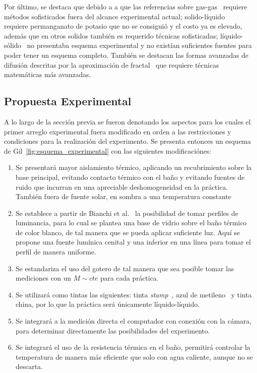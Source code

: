 \documentclass[11pt]{article}
\begin{document}
Por último, se destaca que debido a a que las referencias sobre gas-gas~\cite{hanTemperatureDependenceOxygen1996} requiere métodos sofisticados fuera del alcance experimental actual; solido-líquido~\cite{micaelaDifusionKMnO4Agua2006} requiere permanganato de potasio que no se consiguió y el costo ya es elevado, además que en otros solidos también es requerido técnicas sofisticadas; líquido-sólido~\cite{silvaDispersionInkPapers2008a} no presentaba esquema experimental y no existían suficientes fuentes para poder tener un esquema completo. También se destacan las formas avanzadas de difusión descritas por la aproximación de fractal~\cite{heFractalApproachDiffusion2022} que requiere técnicas matemáticas más avanzadas.

\subsection*{Propuesta Experimental}
A lo largo de la sección previa se fueron denotando los aspectos para los cuales el primer arreglo experimental fuera modificado en orden a las restricciones y condiciones para la realización del experimento. Se presenta entonces un esquema de Gil~\ref{fig:esquema_experimental} con las siguientes modificaciónes:
\begin{enumerate}
    \item Se presentará mayor aislamiento térmico, aplicando un recubrimiento sobre la base principal, evitando contacto térmico con el baño y evitando fuentes de ruido que incurran en una apreciable deshomogeneidad en la práctica. También fuera de fuente solar, en sombra a una temperatura constante
    \item Se establece a partir de Bianchi et al.~\cite{micaelaDifusionKMnO4Agua2006} la posibilidad de tomar perfiles de luminancia, para lo cual se plantea una base de vidrio sobre el baño térmico de color blanco, de tal manera que se pueda aplicar suficiente luz. Aquí se propone una fuente lumínica cenital y una inferior en una línea para tomar el perfil de manera uniforme.
    \item Se estandariza el uso del gotero de tal manera que sea posible tomar las mediciones con un $M\sim cte$ para cada práctica.
    \item Se utilizará como tintas las siguientes: tinta \textit{stamp}~\cite{leeInkDifussionWater2004}, azul de metileno~\cite{selifonovDeterminationDiffusionCoefficient2019} y tinta china, por lo que la práctica será únicamente líquido-líquido.
    \item Se integrará a la medición directa el computador con conexión con la cámara, para determinar directamente las posibilidades del experimento.
    \item Se integrará el uso de la resistencia térmica en el baño, permitirá controlar la temperatura de manera más eficiente que solo con agua caliente, aunque no se descarta.
\end{enumerate}
\end{document}
